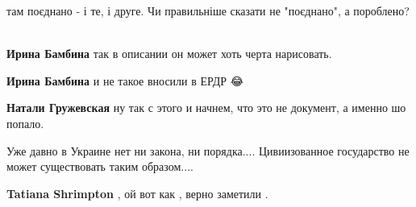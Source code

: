 \begin{itemize}
\begin{itemize}
 
там поєднано - і те, і друге. Чи правильніше сказати не "поєднано", а пороблено? 🤣

 
\textbf{Ирина Бамбина} так в описании он может хоть черта нарисовать.

 
\textbf{Ирина Бамбина} и не такое вносили в ЕРДР 😂

 
\textbf{Натали Гружевская} ну так с этого и начнем, что это не документ, а именно шо попало.
\end{itemize}

 
Уже давно в Украине нет ни закона, ни порядка.... Цивиизованное государство не
может существовать таким образом....

\begin{itemize}
 
\textbf{Tatiana Shrimpton} , ой вот как , верно заметили .


\end{itemize}
\end{itemize}
